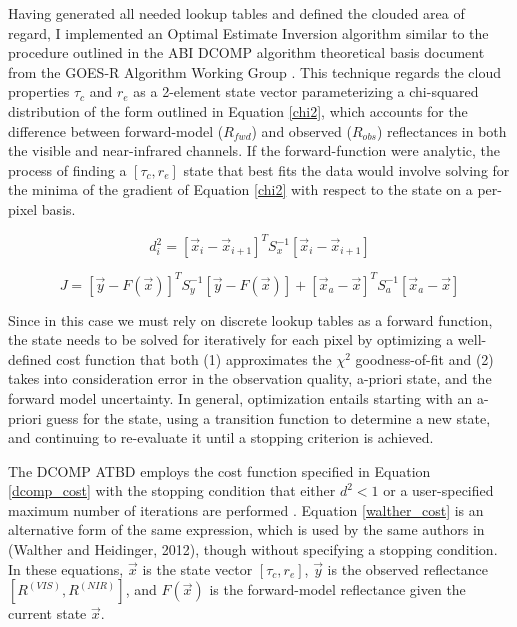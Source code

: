 \documentclass[12pt]{article}
\begin{document}
Having generated all needed lookup tables and defined the clouded area of regard, I implemented an Optimal Estimate Inversion algorithm similar to the procedure outlined in the ABI DCOMP algorithm theoretical basis document from the GOES-R Algorithm Working Group \cite{uw_algorithm_nodate}. This technique regards the cloud properties $\tau_c$ and $r_e$ as a 2-element state vector parameterizing a chi-squared distribution of the form outlined in Equation \ref{chi2}, which accounts for the difference between forward-model ($R_{fwd}$) and observed ($R_{obs}$) reflectances in both the visible and near-infrared channels. If the forward-function were analytic, the process of finding a $[\tau_c, r_e]$ state that best fits the data would involve solving for the minima of the gradient of Equation \ref{chi2} with respect to the state on a per-pixel basis.

\begin{equation}\label{dcomp_cost}
    d^2_i = \left[\vec{x}_i-\vec{x}_{i+1}\right]^TS_x^{-1}\left[\vec{x}_i-\vec{x}_{i+1}\right]
\end{equation}

\begin{equation}\label{walther_cost}
    J = \left[\vec{y}-F(\vec{x})\right]^TS_y^{-1}\left[\vec{y}-F(\vec{x})\right] + \left[\vec{x}_a - \vec{x}\right]^T S_a^{-1} \left[\vec{x}_a - \vec{x}\right]
\end{equation}

Since in this case we must rely on discrete lookup tables as a forward function, the state needs to be solved for iteratively for each pixel by optimizing a well-defined cost function that both (1) approximates the $\chi^2$ goodness-of-fit and (2) takes into consideration error in the observation quality, a-priori state, and the forward model uncertainty. In general, optimization entails starting with an a-priori guess for the state, using a transition function to determine a new state, and continuing to re-evaluate it until a stopping criterion is achieved.

The DCOMP ATBD employs the cost function specified in Equation \ref{dcomp_cost} with the stopping condition that either $d^2 < 1$ or a user-specified maximum number of iterations are performed \cite{uw_algorithm_nodate}. Equation \ref{walther_cost} is an alternative form of the same expression, which is used by the same authors in (Walther and Heidinger, 2012), though without specifying a stopping condition. \cite{walther_implementation_2012} In these equations, $\vec{x}$ is the state vector $[\tau_c, r_e]$, $\vec{y}$ is the observed reflectance $[R^{(VIS)}, R^{(NIR)}]$, and $F(\vec{x})$ is the forward-model reflectance given the current state $\vec{x}$.
\end{document}
